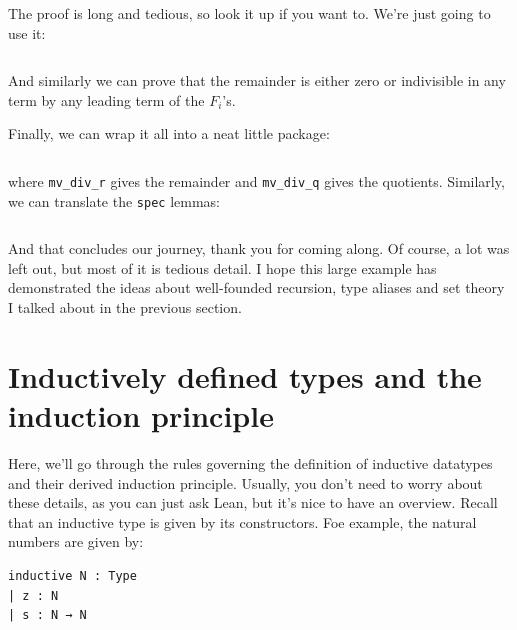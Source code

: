 \documentclass[a4paper, 12pt]{article}
\newcommand{\lean}[1]{\texttt{#1}}
\theoremstyle{changedot}
\theoremstyle{changedotbreak}
\theoremstyle{nonumberplain}
\begin{document}
The proof is long and tedious, so look it up if you want to. We're just going to use it:

\inputminted[firstline=359, lastline=388]{lean}{../src/mv_division.lean}

And similarly we can prove that the remainder is either zero or indivisible in any term by any leading term of the $F_{i}$'s.

Finally, we can wrap it all into a neat little package:

\inputminted[firstline=443, lastline=449]{lean}{../src/mv_division.lean}

where \lean{mv_div_r} gives the remainder and \lean{mv_div_q} gives the quotients. Similarly, we can translate the \lean{spec} lemmas:

\inputminted[firstline=451, lastline=469]{lean}{../src/mv_division.lean}

And that concludes our journey, thank you for coming along. Of course, a lot was left out, but most of it is tedious detail. I hope this large example has demonstrated the ideas about well-founded recursion, type aliases and set theory I talked about in the previous section.































\printbibliography


\appendix
\section{Inductively defined types and the induction principle}\label{sec:ind}
Here, we'll go through the rules governing the definition of inductive datatypes and their derived induction principle. Usually, you don't need to worry about these details, as you can just ask Lean, but it's nice to have an overview. Recall that an inductive type is given by its constructors. Foe example, the natural numbers are given by:

\begin{verbatim}
inductive N : Type
| z : N
| s : N → N 
\end{verbatim}
\end{document}
